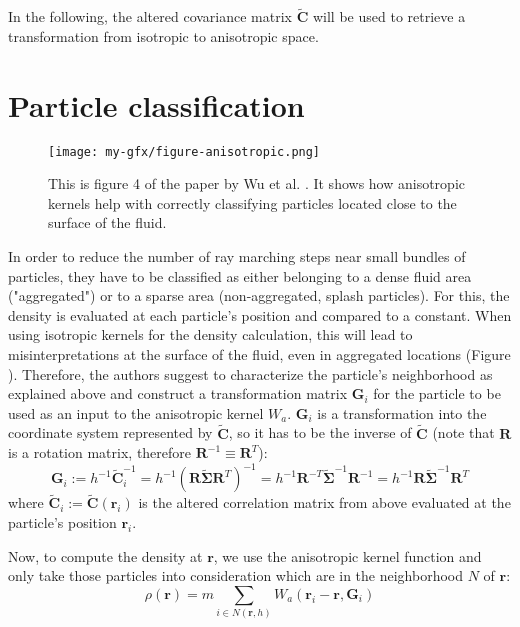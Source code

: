 In the following, the altered covariance matrix $\tilde{\textbf{C}}$ will be used to retrieve a transformation from isotropic to anisotropic space.

\section{Particle classification}
\label{sec:particleclassification}

\begin{figure}[htb]
	\texttt{[image: my-gfx/figure-anisotropic.png]}
	\caption{This is figure 4 of the paper by Wu et al. \cite{Wu:2022}. It shows how anisotropic kernels help with correctly classifying particles located close to the surface of the fluid.}
	\label{fig:particleneighborhood:anisotropic}
\end{figure}

In order to reduce the number of ray marching steps near small bundles of particles, they have to be classified as either belonging to a dense fluid area ("aggregated") or to a sparse area (non-aggregated, splash particles). For this, the density is evaluated at each particle's position and compared to a constant. When using isotropic kernels for the density calculation, this will lead to misinterpretations at the surface of the fluid, even in aggregated locations (Figure ). Therefore, the authors suggest to characterize the particle's neighborhood as explained above and construct a transformation matrix $\textbf{G}_i$ for the particle to be used as an input to the anisotropic kernel $W_a$. $\textbf{G}_i$ is a transformation into the coordinate system represented by $\tilde{\textbf{C}}$, so it has to be the inverse of $\tilde{\textbf{C}}$ (note that $\textbf{R}$ is a rotation matrix, therefore $\textbf{R}^{-1} \equiv \textbf{R}^T$):
\[
\textbf{G}_i :=
h^{-1} \tilde{\textbf{C}}_i^{-1} =
h^{-1} (\textbf{R} \tilde{\bm{\Sigma}} \textbf{R}^T)^{-1} =
h^{-1} \textbf{R}^{-T} \tilde{\bm{\Sigma}}^{-1} \textbf{R}^{-1} =
h^{-1} \textbf{R} \tilde{\bm{\Sigma}}^{-1} \textbf{R}^T
\]
where $\tilde{\textbf{C}}_i := \tilde{\textbf{C}}(\textbf{r}_i)$ is the altered correlation matrix from above evaluated at the particle's position $\textbf{r}_i$.

Now, to compute the density at $\textbf{r}$, we use the anisotropic kernel function and only take those particles into consideration which are in the neighborhood $N$ of $\textbf{r}$:
\[
\rho(\textbf{r}) = m \sum_{i \in N(\textbf{r}, h)} W_a(\textbf{r}_i - \textbf{r}, \textbf{G}_i)
\]

